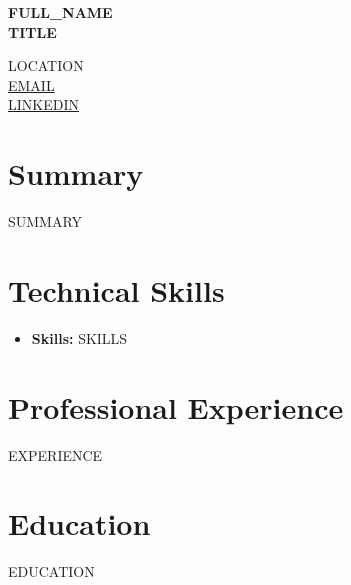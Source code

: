 \documentclass[a4paper,11pt]{article}
\newcommand{\boldtext}[1]{\textbf{#1}}
\begin{document}
\pagestyle{empty}

\noindent
\begin{minipage}[t]{0.65\textwidth}
    \vspace{0pt}
    {\Huge \bfseries {{FULL_NAME}} } \\[0.3cm] 
    {\large \bfseries {{TITLE}} } 
\end{minipage}
\begin{minipage}[t]{0.34\textwidth}
    \vspace{0pt}
    \raggedleft
    {{LOCATION}} \\
    \href{mailto:{{EMAIL}} }{ {{EMAIL}} } \\
    \href{https://{{LINKEDIN}} }{ {{LINKEDIN}} }
\end{minipage}

\vspace{2em}

\section{Summary}
\noindent
{{SUMMARY}}

\section{Technical Skills}
\begin{itemize}
    \item \boldtext{Skills:} {{SKILLS}}
\end{itemize}

\section{Professional Experience}
{{{EXPERIENCE}}}

\section{Education}
\noindent
{{{EDUCATION}}}
\end{document}
